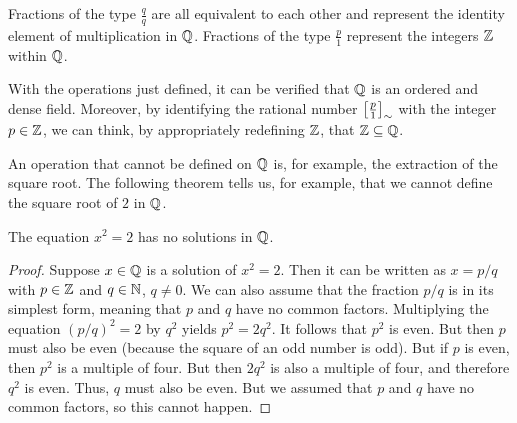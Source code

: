 Fractions of the type $\frac{q}{q}$ are all equivalent to each other and
represent the identity element of multiplication in ${\mathbb Q}$. Fractions of the type
$\frac{p}{1}$ represent the integers ${\mathbb Z}$ within ${\mathbb Q}$.

With the operations just defined, it can be verified that ${\mathbb Q}$ is an ordered
and dense field. Moreover, by identifying the rational number ${\left[ \frac p
1 \right]}_\sim$ with the integer $p\in {\mathbb Z}$, we can think, by appropriately redefining
${\mathbb Z}$, that ${\mathbb Z} \subseteq {\mathbb Q}$.

An operation that cannot be defined on ${\mathbb Q}$ is, for example, the extraction of
the square root. The following theorem tells us, for example, that we cannot
define the square root of $2$ in ${\mathbb Q}$.

\begin{theorem}
  \mymark{**}%
  \label{th:pitagora}%
  The equation $x^2=2$ has no solutions in ${\mathbb Q}$.
  \end{theorem}
  \begin{proof}
  \mymark{*}%
    Suppose $x\in {\mathbb Q}$ is a solution of $x^2=2$. Then it can be written as
  $x=p/q$ with $p\in {\mathbb Z}$ and $q\in {\mathbb N}$, $q\neq 0$. We can also assume that the
  fraction $p/q$ is in its simplest form, meaning that $p$ and $q$ have no
  common factors. Multiplying the equation $(p/q)^2=2$ by $q^2$ yields $p^2 = 2
  q^2$. It follows that $p^2$ is even. But then $p$ must also be even (because
  the square of an odd number is odd). But if $p$ is even, then $p^2$ is a
  multiple of four. But then $2q^2$ is also a multiple of four, and therefore
  $q^2$ is even. Thus, $q$ must also be even. But we assumed that $p$ and $q$
  have no common factors, so this cannot happen.
\end{proof}

